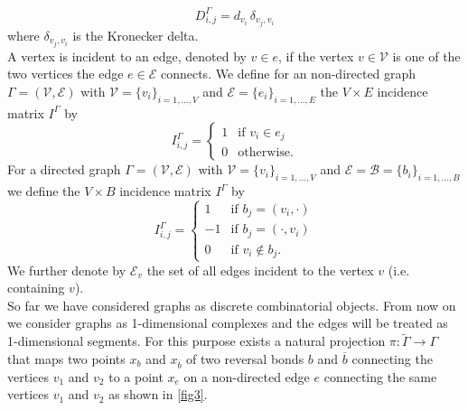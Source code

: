 \begin{equation}
    \label{degree matrix}
    D^{\Gamma}_{i, j} = d_{v_i} \, \delta_{v_j, v_i}
\end{equation}
where $\delta_{v_j, v_i}$ is the Kronecker delta. \\
A vertex is incident to an edge, denoted by $v \in e$, if the vertex $v \in \mathcal{V}$ is one of the two vertices the edge $e \in \mathcal{E}$ connects. We define for an non-directed graph $\Gamma = (\mathcal{V}, \mathcal{E})$ with $\mathcal{V} = \{v_i\}_{i = 1, \ldots, V}$ and $\mathcal{E} = \{e_i\}_{i = 1, \ldots, E}$ the $V \times E$ incidence matrix $I^{\Gamma}$ by  
\begin{equation}
    \label{incidence matrix non-directed}
    I^{\Gamma}_{i, j}= \begin{cases} 1 & \text{if } v_i \in e_j \\ 0 & \text{otherwise.} \end{cases}
\end{equation}
For a directed graph $\Gamma = (\mathcal{V}, \mathcal{E})$ with $\mathcal{V} = \{v_i\}_{i = 1, \ldots, V}$ and $\mathcal{E} = \mathcal{B} = \{b_i\}_{i = 1, \ldots, B}$ we define the $V \times B$ incidence matrix $I^{\Gamma}$ by 
\begin{equation}
    \label{incidence matrix directed}
    I^{\Gamma}_{i, j}= \begin{cases} 1 & \text{if } b_j = (v_i, \cdot) \\ -1 & \text{if } b_j = (\cdot, v_i) \\ 0 & \text{if } v_i \notin b_j. \end{cases}
\end{equation}
We further denote by $\mathcal{E}_v$ the set of all edges incident to the vertex $v$ (i.e. containing $v$). \\

So far we have considered graphs as discrete combinatorial objects. From now on we consider graphs as 1-dimensional complexes and the edges will be treated as 1-dimensional segments. For this purpose exists a natural projection $\pi \colon \widetilde{\Gamma} \to \Gamma$ that maps two points $x_b$ and $x_{\overline{b}}$ of two reversal bonds $b$ and $\overline{b}$ connecting the vertices $v_1$ and $v_2$ to a point $x_e$ on a non-directed edge $e$ connecting the same vertices $v_1$ and $v_2$ as shown in \cref{fig3}.

